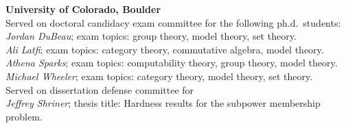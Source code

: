 \documentclass[margin,line]{resume}
\begin{document}
\begin{resume}

    
    
    \noindent \textbf{University of Colorado, Boulder}\\[2pt]
    \noindent Served on doctoral candidacy exam committee for the following ph.d.~students:\\[2pt]
    \textit{Jordan DuBeau}; exam topics: group theory, model theory, set theory.\\ [0pt]
    \textit{Ali Latfi}; exam topics: category theory, commutative algebra, model theory.\\[0pt]
    \textit{Athena Sparks}; exam topics: computability theory, group theory, model theory.\\[0pt]
    \textit{Michael Wheeler}; exam topics: category theory, model theory, set theory.\\[4pt]
    \noindent Served on dissertation defense committee for\\
    \textit{Jeffrey Shriner}; thesis title: Hardness results for the subpower membership problem.


\end{resume}
\end{document}
